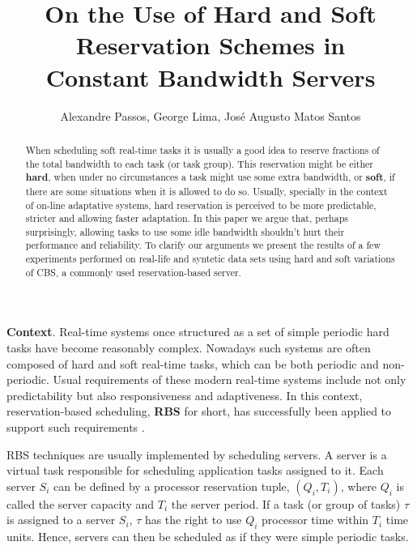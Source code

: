 \documentclass[times, 10pt,twocolumn]{article}
\author{Alexandre Passos, George Lima, Jos\'e Augusto Matos Santos}
\title{On the Use of Hard and Soft Reservation Schemes in \\ Constant Bandwidth Servers}
\begin{document}
\graphicspath{{figs/}{data/}}

\maketitle

\begin{abstract}

  When scheduling soft real-time tasks it is usually a good idea to
  reserve fractions of the total bandwidth to each task (or task
  group). This reservation might be either \textbf{hard}, when under
  no circumstances a task might use some extra bandwidth, or
  \textbf{soft}, if there are some situations when it is allowed to do
  so. Usually, specially in the context of on-line adaptative systems,
  hard reservation is perceived to be more predictable, stricter and
  allowing faster adaptation. In this paper we argue that, perhaps
  surprisingly, allowing tasks to use some idle bandwidth shouldn't
  hurt their performance and reliability. To clarify our arguments we
  present the results of a few experiments performed on real-life and
  syntetic data sets using hard and soft variations of CBS, a commonly
  used reservation-based server.
  
\end{abstract}

\label{sec:introduction}

\textbf{Context}.  Real-time systems once structured as a set of
simple periodic hard tasks \cite{liu.ea73:scheduling} have become
reasonably complex. Nowadays such systems are often composed of hard
and soft real-time tasks, which can be both periodic and non-periodic.
Usual requirements of these modern real-time systems include not only
predictability but also responsiveness and adaptiveness. In this
context, reservation-based scheduling, \textbf{RBS} for short, has
successfully been applied to support such requirements
\cite{abeni.ea04:resource,mercer.ea94:processor,rajkumar.ea98:resource,sprunt.ea89:aperiodic,steffens.ea03:resource}.

RBS techniques are usually implemented by scheduling servers. A server
is a virtual task responsible for scheduling application tasks
assigned to it.  Each server $S_i$ can be defined by a processor
reservation tuple, $(Q_i,T_i)$, where $Q_i$ is called the server
capacity and $T_i$ the server period.  If a task (or group of tasks)
$\tau$ is assigned to a server $S_i$, $\tau$ has the right to use
$Q_i$ processor time within $T_i$ time units. Hence, servers can then
be scheduled as if they were simple periodic tasks.
\end{document}
